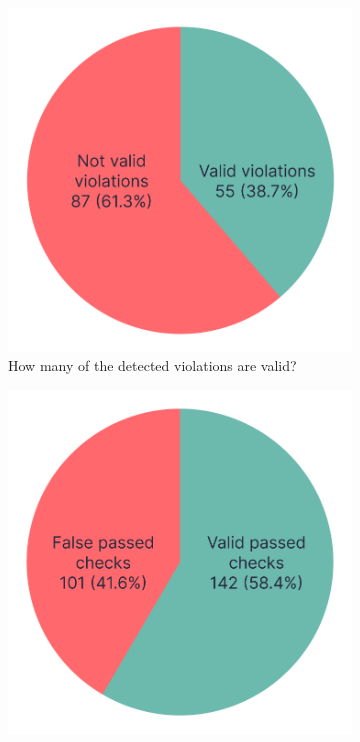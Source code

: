 \documentclass{master_thesis}
\begin{document}
\begin{figure}[h]
	\centering
	\begin{subfigure}{0.4\textwidth}
	\includegraphics[width=\textwidth]{img/failed-tests.png}
	\caption{How many of the detected violations are valid?}
	\label{fig:checks-validity-failed}
	\end{subfigure}
	\begin{subfigure}{0.4\textwidth}
	\includegraphics[width=\textwidth]{img/passed-tests.png}

\end{subfigure}
\end{figure}
\end{document}
